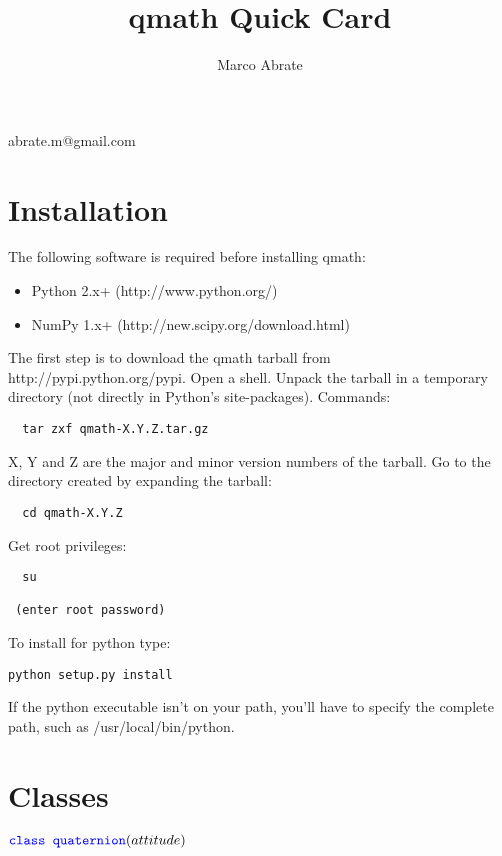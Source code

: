 \documentclass[11pt]{paper}
\begin{document}
\setcounter{page}{1}

\title{qmath Quick Card}
\author{Marco Abrate} 
\maketitle
\vskip-0.6cm
\noindent \small{abrate.m@gmail.com}




\tableofcontents

\section{Installation}

The following software is required before installing qmath:
\begin{itemize}
\item Python 2.x+ (http://www.python.org/)\\
\item NumPy 1.x+ (http://new.scipy.org/download.html)
\end{itemize} 

\bigskip

\noindent The first step is to download the qmath tarball from http://pypi.python.org/pypi.
Open a shell. Unpack the tarball in a temporary directory (not directly in Python's site-packages). Commands:
\begin{verbatim}
  tar zxf qmath-X.Y.Z.tar.gz
\end{verbatim}
X, Y and Z are the major and minor version numbers of the tarball.
Go to the directory created by expanding the tarball:
\begin{verbatim}
  cd qmath-X.Y.Z
\end{verbatim}
Get root privileges:
\begin{verbatim}
  su
 
 (enter root password)
\end{verbatim}
To install for python type:
\begin{verbatim}
python setup.py install
\end{verbatim}
If the python executable isn't on your path, you'll have to specify the complete path, such as /usr/local/bin/python.

\bigskip

\section{Classes}

\noindent $\textcolor{blue}{\texttt{class quaternion}}(attitude)$
\end{document}
